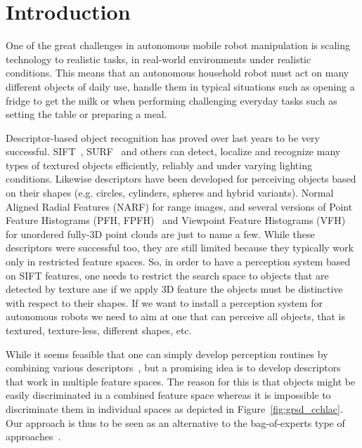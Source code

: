 \documentclass[conference]{sty/IEEEtran}
\begin{document}
\section{Introduction}
One of the great challenges in autonomous mobile robot manipulation is scaling
technology to realistic tasks, in real-world environments under realistic
conditions. This means that an autonomous household robot must act on many
different objects of daily use, handle them in typical situations such as
opening a fridge to get the milk or when performing challenging everyday tasks
such as setting the table or preparing a meal.

Descriptor-based object recognition has proved over last years to be very successful.
SIFT~\cite{lowe04distinctive}, SURF~\cite{surf} and others can
detect, localize and recognize many types of textured objects efficiently, reliably
and under varying lighting conditions. Likewise descriptors have been developed 
for perceiving objects based on their shapes (e.g. circles, cylinders, spheres and hybrid variants).
Normal Aligned Radial Features (NARF)\cite{steder10irosws} for range images, 
and several versions of Point Feature  Histograms (PFH, FPFH)~\cite{Rusu09ICRA} and 
Viewpoint Feature Histograms (VFH)~\cite{vfh} for unordered fully-3D point clouds are just 
to name a few. While these descriptors were successful too, they are still limited because they
typically work only in restricted feature spaces. So, in order to have a perception system
based on SIFT features, one needs to restrict the search space to objects that are detected by
texture ane if we apply 3D feature the objects must be distinctive with respect to their shapes. 
If we want to install a perception system for autonomous robots we need to aim 
at one that can perceive all objects, that is textured, texture-less, different shapes, etc.

While it seems feasible that one can simply develop perception routines by combining
various descriptors~\cite{stueckler10combining, GRSD10Humanoids}, but a promising idea 
is to develop descriptors that work in multiple feature spaces. The reason for this is 
that objects might be easily discriminated in a combined feature space whereas it is impossible 
to discriminate them in individual spaces as depicted in Figure~\ref{fig:grsd_cchlac}.
Our approach is thus to be seen as an alternative to the bag-of-experts type
of approaches~\cite{Varma07learningthe}.
\end{document}
